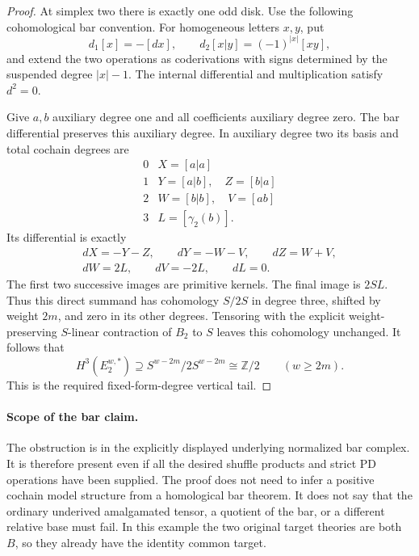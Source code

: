 \begin{proof}
At simplex two there is exactly one odd disk. Use the following
cohomological bar convention. For homogeneous letters \(x,y\), put
\[
 d_1[x]=-[dx],\qquad d_2[x|y]=(-1)^{|x|}[xy],
\]
and extend the two operations as coderivations with signs determined
by the suspended degree \(|x|-1\). The internal differential and
multiplication satisfy \(d^2=0\).

Give \(a,b\) auxiliary degree one and all coefficients auxiliary degree
zero. The bar differential preserves this auxiliary degree. In auxiliary
degree two its basis and total cochain degrees are
\[
\begin{array}{c|c}
0&X=[a|a]\\
1&Y=[a|b],\quad Z=[b|a]\\
2&W=[b|b],\quad V=[ab]\\
3&L=[\gamma_2(b)] .
\end{array}
\]
Its differential is exactly
\[
\begin{gathered}
 dX=-Y-Z,\qquad dY=-W-V,\qquad dZ=W+V,\\
 dW=2L,\qquad dV=-2L,\qquad dL=0 .
\end{gathered}
\]
The first two successive images are primitive kernels. The final image
is \(2S L\). Thus this direct summand has cohomology \(S/2S\) in degree
three, shifted by weight \(2m\), and zero in its other degrees.
Tensoring with the explicit weight-preserving \(S\)-linear contraction
of \(B_2\) to \(S\) leaves this cohomology unchanged. It follows that
\[
              H^3(E_2^{w,*})\supseteq S^{w-2m}/2S^{w-2m}
                        \cong\mathbb Z/2\qquad(w\geq2m).
\]
This is the required fixed-form-degree vertical tail.
\end{proof}

\paragraph{Scope of the bar claim.}
The obstruction is in the explicitly displayed underlying normalized
bar complex. It is therefore present even if all the desired shuffle
products and strict PD operations have been supplied. The proof does
not need to infer a positive cochain model structure from a homological
bar theorem. It does not say that the ordinary underived amalgamated
tensor, a quotient of the bar, or a different relative base must fail.
In this example the two original target theories are both \(B\), so
they already have the identity common target.

